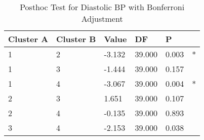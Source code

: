 \begin{table}[h]
\caption{Posthoc Test for Diastolic BP with Bonferroni Adjustment}
\label{tab:posthoc_Diastolic_BP}
\begin{tabular}{llllll}
\toprule
Cluster A & Cluster B & Value & DF & P &   \\
\midrule
1 & 2 & -3.132 & 39.000 & 0.003 & * \\
1 & 3 & -1.444 & 39.000 & 0.157 &   \\
1 & 4 & -3.067 & 39.000 & 0.004 & * \\
2 & 3 & 1.651 & 39.000 & 0.107 &   \\
2 & 4 & -0.135 & 39.000 & 0.893 &   \\
3 & 4 & -2.153 & 39.000 & 0.038 &   \\
\bottomrule
\end{tabular}
\end{table}

